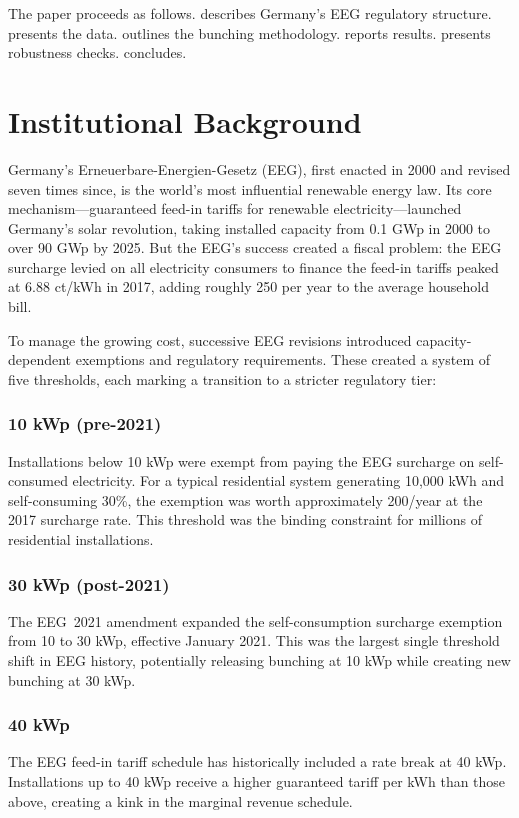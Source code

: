 \documentclass[12pt]{article}
\begin{document}
The paper proceeds as follows.  describes Germany's EEG regulatory structure.  presents the data.  outlines the bunching methodology.  reports results.  presents robustness checks.  concludes.


\section{Institutional Background}
\label{sec:institutional}

Germany's Erneuerbare-Energien-Gesetz (EEG), first enacted in 2000 and revised seven times since, is the world's most influential renewable energy law. Its core mechanism---guaranteed feed-in tariffs for renewable electricity---launched Germany's solar revolution, taking installed capacity from 0.1 GWp in 2000 to over 90 GWp by 2025. But the EEG's success created a fiscal problem: the EEG surcharge levied on all electricity consumers to finance the feed-in tariffs peaked at 6.88 ct/kWh in 2017, adding roughly \texteuro{}250 per year to the average household bill.

To manage the growing cost, successive EEG revisions introduced capacity-dependent exemptions and regulatory requirements. These created a system of five thresholds, each marking a transition to a stricter regulatory tier:

\subsubsection*{10 kWp (pre-2021)} Installations below 10 kWp were exempt from paying the EEG surcharge on self-consumed electricity. For a typical residential system generating 10,000 kWh and self-consuming 30\%, the exemption was worth approximately \texteuro{}200/year at the 2017 surcharge rate. This threshold was the binding constraint for millions of residential installations.

\subsubsection*{30 kWp (post-2021)} The EEG~2021 amendment expanded the self-consumption surcharge exemption from 10 to 30 kWp, effective January 2021. This was the largest single threshold shift in EEG history, potentially releasing bunching at 10 kWp while creating new bunching at 30 kWp.

\subsubsection*{40 kWp} The EEG feed-in tariff schedule has historically included a rate break at 40 kWp. Installations up to 40 kWp receive a higher guaranteed tariff per kWh than those above, creating a kink in the marginal revenue schedule.
\end{document}
